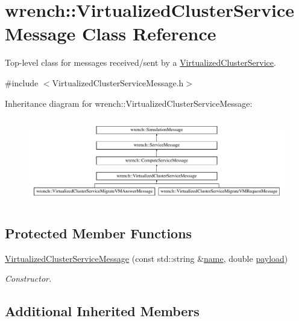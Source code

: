 \hypertarget{classwrench_1_1_virtualized_cluster_service_message}{}\section{wrench\+:\+:Virtualized\+Cluster\+Service\+Message Class Reference}
\label{classwrench_1_1_virtualized_cluster_service_message}


Top-\/level class for messages received/sent by a \hyperlink{classwrench_1_1_virtualized_cluster_service}{Virtualized\+Cluster\+Service}.  




{\ttfamily \#include $<$Virtualized\+Cluster\+Service\+Message.\+h$>$}

Inheritance diagram for wrench\+:\+:Virtualized\+Cluster\+Service\+Message\+:\begin{figure}[H]
\begin{center}
\leavevmode
\includegraphics[height=3.783784cm]{classwrench_1_1_virtualized_cluster_service_message}
\end{center}
\end{figure}
\subsection*{Protected Member Functions}
\begin{DoxyCompactItemize}
\item 
\hyperlink{classwrench_1_1_virtualized_cluster_service_message_a124699b0def3ecd4bd91f9ea90991471}{Virtualized\+Cluster\+Service\+Message} (const std\+::string \&\hyperlink{classwrench_1_1_simulation_message_ab224f6dd8ec5ee2e7f65bfcdf2b8a86b}{name}, double \hyperlink{classwrench_1_1_simulation_message_a914f2732713f7c02898e66f05a7cb8a1}{payload})
\begin{DoxyCompactList}\small\item\em Constructor. \end{DoxyCompactList}\end{DoxyCompactItemize}
\subsection*{Additional Inherited Members}


